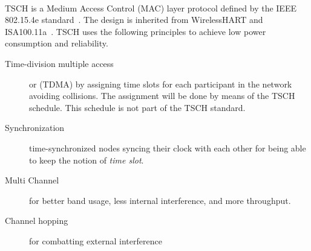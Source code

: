\paragraph{}

%
%

TSCH is a Medium Access Control (MAC) layer protocol defined by the IEEE
802.15.4e standard~\cite{rfc7554}.
The design is inherited from WirelessHART and
ISA100.11a~\cite{Duquennoy2017TSCHA6}.
TSCH uses the following principles to achieve low power consumption and
reliability.

\begin{description}
  \item[Time-division multiple access] or (TDMA) by assigning time slots for each
    participant in the network avoiding collisions. The assignment will be done
    by means of the TSCH schedule. This schedule is not part of the TSCH standard.
  \item[Synchronization] time-synchronized nodes syncing their clock with each
    other for being able to keep the notion of \emph{time slot}.
  \item[Multi Channel] for better band usage, less internal interference, and more
    throughput.
  \item[Channel hopping] for combatting external interference
\end{description}

